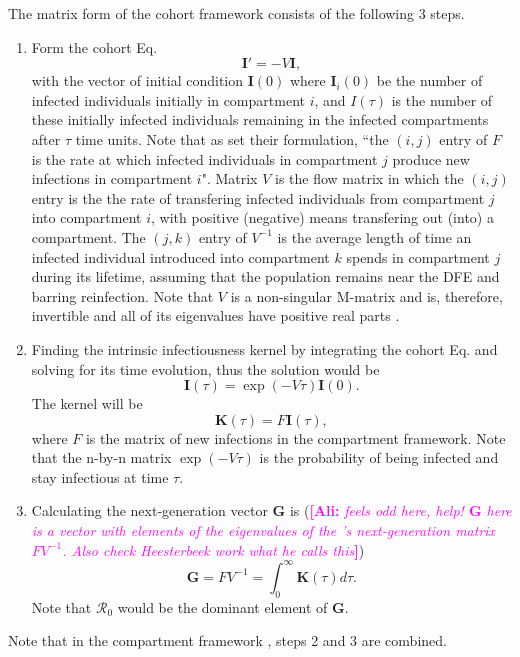 \documentclass[12pt]{article}
\newcommand{\ali}[1]{\comment{magenta}{Ali}{#1}}
\DeclareRobustCommand\_{\ifmmode\expandafter\subtxt\else\textunderscore\fi}
\newcommand{\R}{\ensuremath{\mathcal{R}_0}}
\renewcommand{\vec}[1]{\ensuremath{\mathbf{#1}}} %
\newcommand{\comment}{\showcomment}
\newcommand{\showcomment}[3]{\textcolor{#1}{\textbf{[#2: }\textsl{#3}\textbf{]}}}
\theoremstyle{definition} %
\begin{document}
The matrix form of the cohort framework consists of the following 3 steps.
\begin{enumerate}[{\it Step 1.}]
\item
Form the cohort Eq. 
\begin{equation}
\label{eq:cohort}
\vec I'=-V \vec I,
\end{equation}
 with the vector of initial condition $\vec I(0)$ where $\vec I_i(0)$ be the number of infected individuals initially in compartment $i$, and $I(\tau)$ is the number of these initially infected individuals remaining in the infected compartments after $\tau$ time units.
Note that as \cite{van2002reproduction} set their formulation, 
``the $(i,j)$ entry of $F$ is the rate at which infected individuals in compartment $j$ produce new infections in compartment $i$". Matrix $V$ is the flow matrix in which the $(i,j)$ entry is the the rate of transfering infected individuals from compartment $j$ into compartment $i$, with positive (negative) means transfering out (into) a compartment.
The $(j,k)$ entry of $V^{-1}$ is the average length of time an infected individual introduced into compartment $k$ spends in compartment $j$ during its lifetime, assuming that the population remains near the DFE and barring reinfection.
Note that $V$ is a non-singular M-matrix and is, therefore, invertible and all of its eigenvalues have positive real parts \citep{van2002reproduction}.

\item 
Finding the intrinsic infectiousness kernel by integrating the cohort Eq. and solving for its time evolution, thus
the solution would be 
\begin{equation}
\label{eq:I}
\vec I(\tau) = \exp(-V\tau) \vec I(0).
\end{equation}
The kernel will be 
\begin{equation}
\label{eq:kernel}
\vec K(\tau) = F \vec I(\tau), 
\end{equation}
where $F$ is the matrix of new infections in the compartment framework.
Note that the n-by-n matrix $\exp(-V\tau)$ is the probability of being infected and stay infectious at time $\tau$. 

\item
Calculating the next-generation vector $\vec G$ is 
(\ali{feels odd here, help! $\vec G$ here is a vector with elements of the eigenvalues of the \citep{van2002reproduction}'s next-generation matrix $FV^{-1}$. 
Also check Heesterbeek work what he calls this}) 
\begin{equation}
\label{eq:ng} %
\vec G = FV^{-1} = \int_0^\infty \vec K(\tau) d\tau.
\end{equation}
Note that $\R$ would be the dominant element of $\vec G$.
\end{enumerate}
Note that in the compartment framework \cite{van2002reproduction}, steps 2 and 3 are combined.
\end{document}
